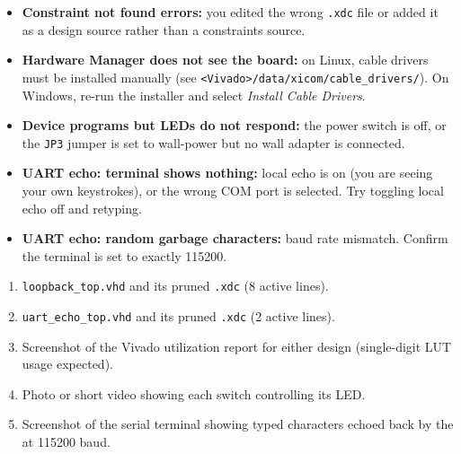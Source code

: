 \documentclass[11pt,letterpaper]{article}
\begin{document}
\begin{tcolorbox}[warning={Common Pitfalls}]
	\begin{itemize}[leftmargin=1.2em]
		\item \textbf{Constraint not found errors:} you edited the wrong \texttt{.xdc} file or added it as a design source rather than a constraints source.
		\item \textbf{Hardware Manager does not see the board:} on Linux, cable drivers must be installed manually (see \texttt{<Vivado>/data/xicom/cable\_drivers/}). On Windows, re-run the installer and select \textit{Install Cable Drivers}.
		\item \textbf{Device programs but LEDs do not respond:} the power switch is off, or the \texttt{JP3} jumper is set to wall-power but no wall adapter is connected.
		\item \textbf{UART echo: terminal shows nothing:} local echo is on (you are seeing your own keystrokes), or the wrong COM port is selected. Try toggling local echo off and retyping.
		\item \textbf{UART echo: random garbage characters:} baud rate mismatch. Confirm the terminal is set to exactly 115200.
	\end{itemize}
\end{tcolorbox}

\begin{tcolorbox}[deliverable={Lab Handout 1-E Deliverable}]
	\begin{enumerate}[leftmargin=1.2em]
		\item \texttt{loopback\_top.vhd} and its pruned \texttt{.xdc} (8 active lines).
		\item \texttt{uart\_echo\_top.vhd} and its pruned \texttt{.xdc} (2 active lines).
		\item Screenshot of the Vivado utilization report for either design (single-digit LUT usage expected).
		\item Photo or short video showing each switch controlling its LED.
		\item Screenshot of the serial terminal showing typed characters echoed back by the \FPGA{} at 115200 baud.
	\end{enumerate}
\end{tcolorbox}

\printhandoutglossary
\end{document}
